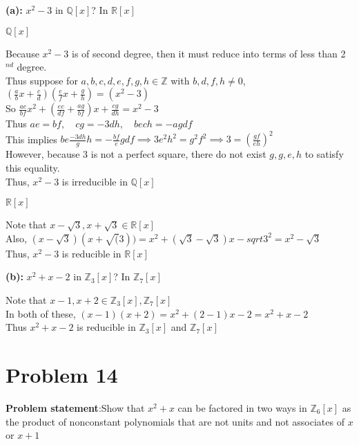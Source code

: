 \documentclass{article} %
\begin{document}
\textbf{(a): }$x^2 - 3$ in $\mathbb{Q}[x]$? In $\mathbb{R}[x]$
\begin{addmargin}[1em]{0em}
$\mathbb{Q}[x]$
\begin{addmargin}[1em]{0em}
Because $x^2 - 3$ is of second degree, then it must reduce into terms of less than 2$^{nd}$ degree.
\\Thus suppose for $a,b,c,d,e,f,g,h \in \mathbb{Z}$ with $b,d,f,h \neq 0$, $(\frac{a}{b}x + \frac{c}{d})(\frac{e}{f}x + \frac{g}{h}) = (x^2 - 3)$
\\So $\frac{ae}{bf}x^2 + (\frac{ec}{df} + \frac{ag}{bf})x + \frac{cg}{dh} = x^2 - 3$
\\Thus $ae = bf, \quad cg = -3dh, \quad bech = -agdf$
\\This implies $be\frac{-3dh}{g}h = -\frac{bf}{e}gdf \implies 3e^2h^2 = g^2f^2 \implies 3 = (\frac{gf}{eh})^2$
\\However, because 3 is not a perfect square, there do not exist $g,g,e,h$ to satisfy this equality.
\\Thus, $x^2 - 3$ is irreducible in $\mathbb{Q}[x]$
\end{addmargin}
$\mathbb{R}[x]$
\begin{addmargin}[1em]{0em}
Note that $x - \sqrt{3}, x + \sqrt{3} \in \mathbb{R}[x]$
\\Also, $(x - \sqrt{3})(x + \sqrt(3)) = x^2 + (\sqrt{3} - \sqrt{3})x - sqrt{3}^2 = x^2 - \sqrt{3}$
\\Thus, $x^2 - 3$ is reducible in $\mathbb{R}[x]$
\end{addmargin}
\end{addmargin}


\textbf{(b): }$x^2 + x - 2$ in $\mathbb{Z}_3[x]$? In $\mathbb{Z}_7[x]$
\begin{addmargin}[1em]{0em}
Note that $x-1, x+2 \in \mathbb{Z}_3[x], \mathbb{Z}_7[x]$
\\In both of these, $(x-1)(x+2) = x^2 + (2 - 1)x - 2 = x^2 + x - 2$
\\Thus $x^2 + x - 2$ is reducible in $\mathbb{Z}_3[x]$ and $\mathbb{Z}_7[x]$
\end{addmargin}

\newpage

\section*{Problem 14}


\textbf{Problem statement}:Show that $x^2 + x$ can be factored in two ways in $\mathbb{Z}_6[x]$ as the product of nonconstant polynomials that are not units and not associates of $x$ or $x + 1$
\\
\end{document}
